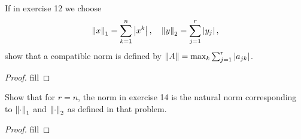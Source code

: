 \begin{exercise}{14}
If in exercise 12 we choose 
\[
\left\lVert x\right\rVert_1=\sum^n_{k=1}\left\lvert x^k\right\rvert,\quad \left\lVert y\right\rVert_2=\sum^r_{j=1}\left\lvert y_j\right\rvert,
\]
show that a compatible norm is defined by $\left\lVert A\right\rVert=\max_k\sum^r_{j=1}\left\lvert a_{jk}\right\rvert$.
\end{exercise}
\begin{proof}
fill
\end{proof}

\begin{exercise}{15}
Show that for $r=n$, the norm in exercise 14 is the natural norm corresponding to $\left\lVert \cdot\right\rVert_1$ and $\left\lVert \cdot\right\rVert_2$ as defined in that problem.
\end{exercise}
\begin{proof}
fill
\end{proof}